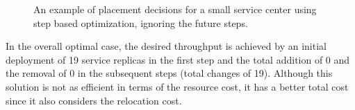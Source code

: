 \begin{figure}[h]
\begin{center}
\qquad  
%
  \qquad
%
\caption[An example of placement decisions for a small service center using step based optimization, ignoring the future steps.]{An example of placement decisions for a small service center using step based optimization, ignoring the future steps.} 
\label{fig:stage_based_optimal_example}  
\end{center}
\end{figure}  

 In the overall optimal case, the desired throughput is achieved by an initial deployment of 19 service replicas in the first step and the total addition of 0 and the removal of 0 in the subsequent steps (total changes of 19). Although this solution is not as efficient in terms of the resource cost, 
it has a better total cost since it also considers the relocation cost. 

